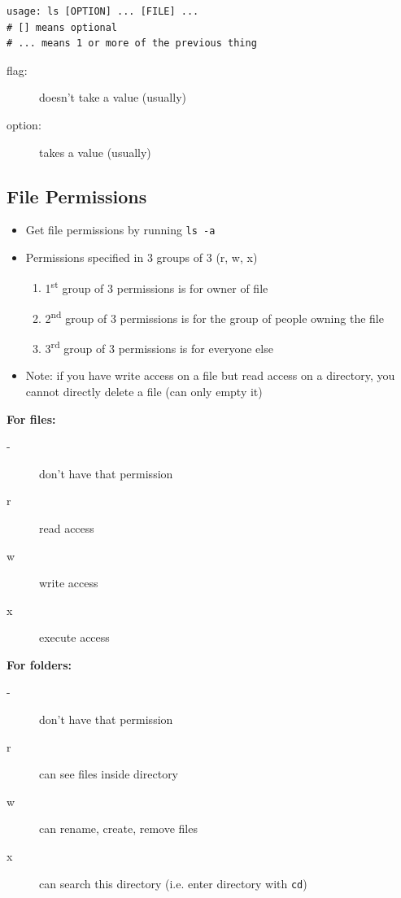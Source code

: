 \documentclass[letterpaper,12pt]{article}
\begin{document}
\begin{lstlisting}
usage: ls [OPTION] ... [FILE] ...
# [] means optional
# ... means 1 or more of the previous thing
\end{lstlisting}

\begin{description}
 \item[flag:] doesn't take a value (usually)
 \item[option:] takes a value (usually)
\end{description}

\subsection{File Permissions}
\begin{itemize}
 \item Get file permissions by running \lstinline{ls -a}
 \item Permissions specified in 3 groups of 3 (r, w, x)
       \begin{enumerate}
        \item 1\textsuperscript{st} group of 3 permissions is for owner of file
        \item 2\textsuperscript{nd} group of 3 permissions is for the group of people owning the file
        \item 3\textsuperscript{rd} group of 3 permissions is for everyone else
       \end{enumerate}
 \item Note: if you have write access on a file but read access on a directory, you cannot directly delete a file (can only empty it)
\end{itemize}

\textbf{For files:}
\begin{description}
 \item[-] don't have that permission
 \item[r] read access
 \item[w] write access
 \item[x] execute access
\end{description}

\textbf{For folders:}
\begin{description}
 \item[-] don't have that permission
 \item[r] can see files inside directory
 \item[w] can rename, create, remove files
 \item[x] can search this directory (i.e. enter directory with \lstinline{cd})
\end{description}
\end{document}
